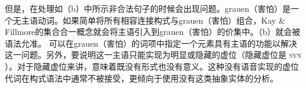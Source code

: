 但是，在处理如（b）中所示非合法句子的时候会出现问题。grauen（害怕）是一个无主语动词。如果简单将所有相容连接构式与grauen（害怕）组合，Kay \& Fillmore的集合合一概念就会将主语引入到grauen（害怕）的价集中。（b）就会被语法允准。
\eal
{}
\zl
可以在grauen（害怕）的词项中指定一个元素具有主语的功能以解决这一问题。另外，要说明这一主语只能实现为明显或隐藏的虚位（隐藏虚位是 \textsc{syn} ）。对于隐藏虚位来讲，意味着既没有形式也没有意义。这种没有语音实现的虚位代词在构式语法中通常不被接受，更倾向于使用没有这类抽象实体的分析。

